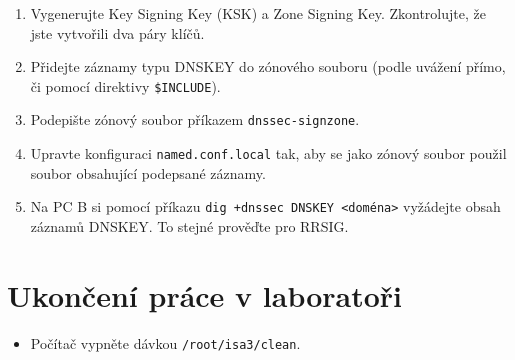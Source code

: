 \begin{enumerate}

  \item Vygenerujte Key Signing Key (KSK) a Zone Signing Key. Zkontrolujte, že
    jste vytvořili dva páry klíčů.

  \item Přidejte záznamy typu DNSKEY do zónového souboru (podle uvážení přímo,
    či pomocí direktivy \verb|$INCLUDE|).

  \item Podepište zónový soubor příkazem \verb|dnssec-signzone|.

  \item Upravte konfiguraci {\tt named.conf.local} tak, aby se jako zónový
    soubor použil soubor obsahující podepsané záznamy.

  \item Na PC B si pomocí příkazu {\tt dig +dnssec DNSKEY <doména>} vyžádejte obsah záznamů
    DNSKEY. To stejné prověďte pro RRSIG.

\end{enumerate}


\section{Ukončení práce v laboratoři}
\begin{itemize}
  \item Počítač vypněte dávkou {\tt /root/isa3/clean}.
\end{itemize}
